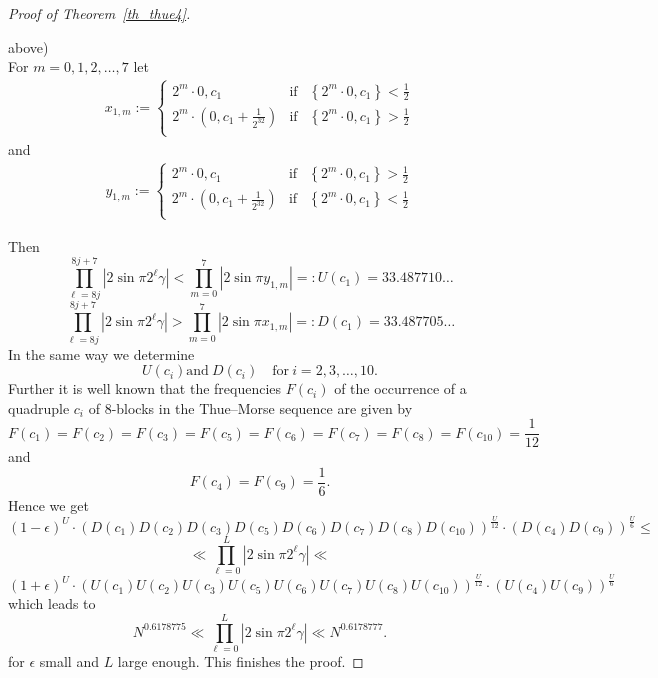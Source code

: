 \documentclass[12pt]{amsart}
\begin{document}
\begin{proof}[Proof of Theorem~\ref{th_thue4}]
\begin{enumerate}
\hspace{8,3cm} above)\\
For $m=0,1,2,\ldots, 7$ let
\begin{align*}
x_{1,m} := \left\{ \begin{array}{lll}
2^{m} \cdot 0, c_{1} & \mbox{if} & \left\{2^{m} \cdot 0, c_{1}\right\} < \frac{1}{2}\\
2^{m} \cdot \left(0, c_{1} + \frac{1}{2^{32}}\right) & \mbox{if} & \left\{2^{m} \cdot 0, c_{1} \right\} > \frac{1}{2}\\
\end{array} \right.
\end{align*}
and
\begin{align*}
y_{1,m} := \left\{ \begin{array}{lll}
2^{m} \cdot 0, c_{1} & \mbox{if} & \left\{2^{m} \cdot 0, c_{1}\right\} > \frac{1}{2}\\
2^{m} \cdot \left(0, c_{1} + \frac{1}{2^{32}}\right) & \mbox{if} & \left\{2^{m} \cdot 0, c_{1} \right\} < \frac{1}{2}\\
\end{array} \right.
\end{align*}
\end{enumerate}
Then
$$
\prod^{8 j+7}_{\ell=8 j} \left|2 \sin \pi 2^{\ell} \gamma\right| < \prod^{7}_{m=0} \left|2 \sin \pi y_{1,m}\right|=:U(c_{1}) = 33.487710\ldots 
$$
$$
\prod^{8 j +7}_{\ell=8 j} \left|2 \sin \pi 2^{\ell} \gamma\right| > \prod^{7}_{m=0} \left|2 \sin \pi x_{1,m}\right| =: D(c_{1}) = 33.487705\ldots
$$
In the same way we determine 
$$U\left(c_{i}\right) \mbox{and}~ D\left(c_{i}\right) \quad \mbox{for} ~ i=2,3, \ldots, 10.$$
Further it is well known that the frequencies $F\left(c_{i}\right)$ of the occurrence of a quadruple $c_{i}$ of $8$-blocks in the Thue--Morse sequence are given by 
$$
F\left(c_{1}\right)= F\left(c_{2}\right) = F\left(c_{3}\right)=F\left(c_{5}\right)=F\left(c_{6}\right)=F\left(c_{7}\right)=F\left(c_{8}\right)=F\left(c_{10}\right)= \frac{1}{12}
$$
and
$$
F\left(c_{4}\right)=F\left(c_{9}\right)= \frac{1}{6}.
$$
Hence we get
$$
( 1 - \epsilon )^U \cdot\left(D\left(c_{1}\right) D\left(c_{2}\right) D\left(c_{3}\right) D\left(c_{5}\right) D\left(c_{6}\right) D\left(c_{7}\right) D\left(c_{8}\right) D\left(c_{10}\right)\right)^{\frac{U}{12}} \cdot \left(D\left(c_{4}\right) D\left(c_{9}\right)\right)^{\frac{U}{6}} \leq
$$
$$
\ll \prod^{L}_{\ell=0} \left|2 \sin \pi 2^{\ell} \gamma \right| \ll
$$
$$
(1 + \epsilon )^U \cdot \left(U\left(c_{1}\right) U\left(c_{2}\right) U\left(c_{3}\right) U\left(c_{5}\right) U\left(c_{6}\right) U\left(c_{7}\right) U\left(c_{8}\right) U\left(c_{10}\right)\right)^{\frac{U}{12}} \cdot \left(U\left(c_{4}\right) U\left(c_{9}\right)\right)^{\frac{U}{6}}
$$
which leads to
$$
N^{0.6178775} \ll \prod^{L}_{\ell=0} \left|2 \sin \pi 2^{\ell} \gamma\right| \ll N^{0.6178777}.
$$
for $\epsilon$ small and $L$ large enough. This finishes the proof.
\end{proof}
\end{document}
